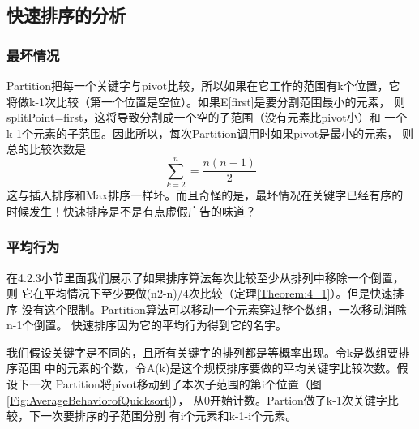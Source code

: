 \subsection{快速排序的分析}\label{Sec:AnalysisofQuickSort}
\subsubsection{最坏情况}
Partition把每一个关键字与pivot比较，所以如果在它工作的范围有k个位置，它
将做k-1次比较（第一个位置是空位）。如果E[first]是要分割范围最小的元素，
则splitPoint=first，这将导致分割成一个空的子范围（没有元素比pivot小）和
一个k-1个元素的子范围。因此所以，每次Partition调用时如果pivot是最小的元素，
则总的比较次数是
\begin{displaymath}
    \sum_{k=2}^n=\frac{n(n-1)}{2}
\end{displaymath}
这与插入排序和Max排序一样坏。而且奇怪的是，最坏情况在关键字已经有序的
时候发生！快速排序是不是有点虚假广告的味道？

\subsubsection{平均行为}
在4.2.3小节里面我们展示了如果排序算法每次比较至少从排列中移除一个倒置，则
它在平均情况下至少要做(n2-n)/4次比较（定理\ref{Theorem:4_1}）。但是快速排序
没有这个限制。Partition算法可以移动一个元素穿过整个数组，一次移动消除n-1个倒置。
快速排序因为它的平均行为得到它的名字。

\begin{figure*}[!t]
    \centering
    \caption{快速排序的平均行为}
    \label{Fig:AverageBehaviorofQuicksort}
\end{figure*}

我们假设关键字是不同的，且所有关键字的排列都是等概率出现。令k是数组要排序范围
中的元素的个数，令A(k)是这个规模排序要做的平均关键字比较次数。假设下一次
Partition将pivot移动到了本次子范围的第i个位置（图\ref{Fig:AverageBehaviorofQuicksort}），
从0开始计数。Partion做了k-1次关键字比较，下一次要排序的子范围分别
有i个元素和k-1-i个元素。

